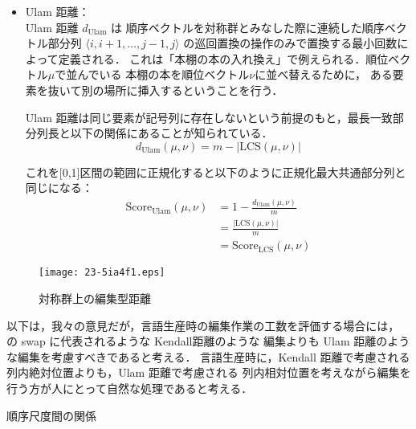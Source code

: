 \documentclass[japanese]{jnlp_1.4}
\renewcommand{\paragraph}{}
\newcommand{\modified}[1]{}
\begin{document}
\begin{itemize}
\item Ulam 距離：\\
Ulam 距離 $d_{\mbox{Ulam}}$ は
順序ベクトルを対称群とみなした際に連続した順序ベクトル部分列 $\langle i,i+1,\ldots,j-1,j \rangle$ の巡回置換の操作のみで置換する最小回数によって定義される．
これは「本棚の本の入れ換え」で例えられる．順位ベクトル$\mu$で並んでいる
      本棚の本を順位ベクトル$\nu$に並べ替えるために，
      ある要素を抜いて別の場所に挿入するということを行う．

Ulam 距離は同じ要素が記号列に存在しないという前提のもと，最長一致部分列長と以下の関係にあることが知られている．
\[
d_{\mbox{Ulam}}(\mu, \nu) = m - |\mbox{LCS}(\mu, \nu)|
\]

これを[0,1]区間の範囲に正規化すると以下のように正規化最大共通部分列と同じになる：
\begin{align*}
  \mbox{Score}_{\mbox{Ulam}} (\mu,\nu) & = 1 - \frac{d_{\mbox{Ulam}}(\mu,\nu)}{m} \\
  & = \frac{|\mbox{LCS}(\mu, \nu)|}{m} \\
  & = \mbox{Score}_{\mbox{LCS}}(\mu,\nu)
\end{align*}

\end{itemize}

\modified{図\ref{fig:editdist}に順序ベクトルによる置換により表現した編集型距離の
例を示す．
編集型距離の定義で許される編集の回数を数えると，順序ベクトル $(1,4,3,2)$と
$(1,2,3,4)$の Kendall 距離は 3，Caylay 距離は 1，Ulam 距離は 2となる．
また，順序ベクトル $(2,3,1,4)$と
$(1,2,3,4)$の Kendall 距離は 2，Caylay 距離は 2，Ulam 距離は 1となる．
}

\begin{figure}[t]
\begin{center}
\texttt{[image: 23-5ia4f1.eps]}
\end{center}
\caption{対称群上の編集型距離}
\label{fig:editdist}
\end{figure}

以下は，我々の意見だが，言語生産時の編集作業の工数を評価する場合には，
\cite{Nivre-2009-ACL}の swap に代表されるような Kendall距離のような
編集よりも Ulam 距離のような編集を考慮すべきであると考える．
言語生産時に，Kendall 距離で考慮される列内絶対位置よりも，Ulam 距離で考慮される
列内相対位置を考えながら編集を行う方が人にとって自然な処理であると考える．


\paragraph{順序尺度間の関係}
\label{para:rankrel}
\end{document}
